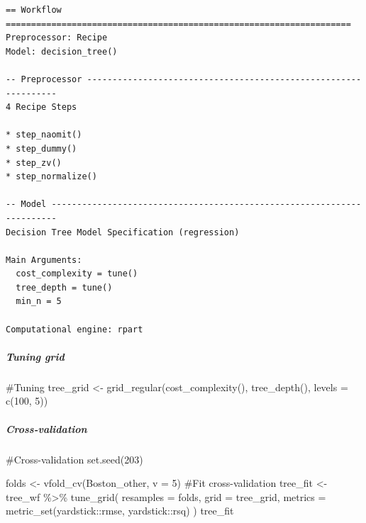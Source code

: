 \documentclass[
]{article}
\let\oldsubparagraph\subparagraph
\renewcommand{\subparagraph}[1]{\oldsubparagraph{#1}\mbox{}}
\newenvironment{Shaded}{\begin{snugshade}}{\end{snugshade}}
\newcommand{\AttributeTok}[1]{\textcolor[rgb]{0.40,0.45,0.13}{#1}}
\newcommand{\CommentTok}[1]{\textcolor[rgb]{0.37,0.37,0.37}{#1}}
\newcommand{\DecValTok}[1]{\textcolor[rgb]{0.68,0.00,0.00}{#1}}
\newcommand{\FunctionTok}[1]{\textcolor[rgb]{0.28,0.35,0.67}{#1}}
\newcommand{\NormalTok}[1]{\textcolor[rgb]{0.00,0.23,0.31}{#1}}
\newcommand{\OtherTok}[1]{\textcolor[rgb]{0.00,0.23,0.31}{#1}}
\newcommand{\SpecialCharTok}[1]{\textcolor[rgb]{0.37,0.37,0.37}{#1}}
\begin{document}
\begin{verbatim}
== Workflow ====================================================================
Preprocessor: Recipe
Model: decision_tree()

-- Preprocessor ----------------------------------------------------------------
4 Recipe Steps

* step_naomit()
* step_dummy()
* step_zv()
* step_normalize()

-- Model -----------------------------------------------------------------------
Decision Tree Model Specification (regression)

Main Arguments:
  cost_complexity = tune()
  tree_depth = tune()
  min_n = 5

Computational engine: rpart 
\end{verbatim}

\hypertarget{tuning-grid}{%
\subparagraph{Tuning grid}\label{tuning-grid}}

\begin{Shaded}
\begin{Highlighting}[]
\CommentTok{\#Tuning}
\NormalTok{tree\_grid }\OtherTok{\textless{}{-}} \FunctionTok{grid\_regular}\NormalTok{(}\FunctionTok{cost\_complexity}\NormalTok{(),}
                          \FunctionTok{tree\_depth}\NormalTok{(),}
                          \AttributeTok{levels =} \FunctionTok{c}\NormalTok{(}\DecValTok{100}\NormalTok{, }\DecValTok{5}\NormalTok{))}
\end{Highlighting}
\end{Shaded}

\hypertarget{cross-validation}{%
\subparagraph{Cross-validation}\label{cross-validation}}

\begin{Shaded}
\begin{Highlighting}[]
\CommentTok{\#Cross{-}validation}
\FunctionTok{set.seed}\NormalTok{(}\DecValTok{203}\NormalTok{)}

\NormalTok{folds }\OtherTok{\textless{}{-}} \FunctionTok{vfold\_cv}\NormalTok{(Boston\_other, }\AttributeTok{v =} \DecValTok{5}\NormalTok{)}
\CommentTok{\#Fit cross{-}validation}
\NormalTok{tree\_fit }\OtherTok{\textless{}{-}}\NormalTok{ tree\_wf }\SpecialCharTok{\%\textgreater{}\%}
  \FunctionTok{tune\_grid}\NormalTok{(}
    \AttributeTok{resamples =}\NormalTok{ folds,}
    \AttributeTok{grid =}\NormalTok{ tree\_grid,}
    \AttributeTok{metrics =} \FunctionTok{metric\_set}\NormalTok{(yardstick}\SpecialCharTok{::}\NormalTok{rmse, yardstick}\SpecialCharTok{::}\NormalTok{rsq)}
\NormalTok{    )}
\NormalTok{tree\_fit}
\end{Highlighting}
\end{Shaded}
\end{document}
